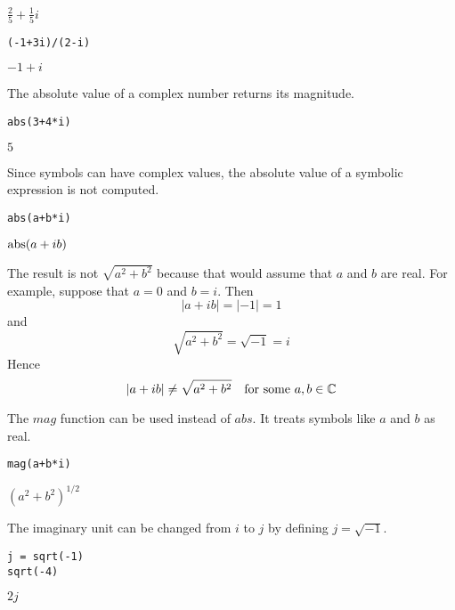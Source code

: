 $\displaystyle \frac{2}{5}+\frac{1}{5}i$

\begin{Verbatim}[formatcom=\color{blue},samepage=true]
(-1+3i)/(2-i)
\end{Verbatim}

$\displaystyle -1+i$

The absolute value of a complex number returns its magnitude.

\begin{Verbatim}[formatcom=\color{blue},samepage=true]
abs(3+4*i)
\end{Verbatim}

$\displaystyle 5$

Since symbols can have complex values, the absolute value
of a symbolic expression is not computed.

\begin{Verbatim}[formatcom=\color{blue},samepage=true]
abs(a+b*i)
\end{Verbatim}

$\displaystyle {\rm abs}(a+ib)$

The result is not $\sqrt{a^2+b^2}$ because that would assume that
$a$ and $b$ are real.
For example, suppose that $a=0$ and $b=i$.
Then
$$|a+ib|=|-1|=1$$
and
$$\sqrt{a^2+b^2}=\sqrt{-1}=i$$
Hence
$$|a+ib|\ne\sqrt{a^2+b^2}\quad\hbox{for some $a,b\in\mathbb C$}$$

The $mag$ function can be used instead of $abs$.
It treats symbols like $a$ and $b$ as real.

\begin{Verbatim}[formatcom=\color{blue},samepage=true]
mag(a+b*i)
\end{Verbatim}

$\displaystyle (a^2+b^2)^{1/2}$

The imaginary unit can be changed from $i$ to $j$
by defining $j=\sqrt{-1}$.

\begin{Verbatim}[formatcom=\color{blue},samepage=true]
j = sqrt(-1)
sqrt(-4)
\end{Verbatim}

$\displaystyle 2j$
